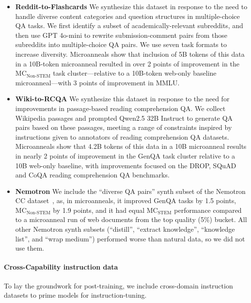 \documentclass[table]{ai2style/ai2}
\begin{document}
\begin{itemize}
\item {\bf Reddit-to-Flashcards} We synthesize this dataset in response to the need to handle diverse content categories and question structures in multiple-choice QA tasks. We first identify a subset of academically-relevant subreddits, and then use GPT 4o-mini to rewrite submission-comment pairs from those subreddits into multiple-choice QA pairs.
We use seven task formats to increase diversity.
Microanneals show that inclusion of 5B tokens of this data in a 10B-token microanneal resulted in over 2 points of improvement in the $\text{MC}_\text{Non-STEM}$ task cluster---relative to a 10B-token web-only baseline microanneal---with 3 points of improvement in MMLU.

\item {\bf Wiki-to-RCQA} We synthesize this dataset in response to the need for improvements in passage-based reading comprehension QA. We collect Wikipedia passages and prompted Qwen2.5 32B Instruct to generate QA pairs based on these passages, meeting a range of constraints inspired by instructions given to annotators of reading comprehension QA datasets. Microanneals show that 4.2B tokens of this data in a 10B microanneal results in nearly 2 points of improvement in the GenQA task cluster relative to a 10B web-only baseline, with improvements focused on the DROP, SQuAD and CoQA reading comprehension QA benchmarks.

\item {\bf Nemotron} We include the ``diverse QA pairs'' synth subset of the Nemotron CC dataset~\citep{su2025nemotroncctransformingcommoncrawl},
as, in microanneals, it improved GenQA tasks by 1.5 points, $\text{MC}_\text{Non-STEM}$ by 1.9 points, and it had equal $\text{MC}_\text{STEM}$ performance compared to a microanneal run of web documents from the top quality (5\%) bucket.
All other Nemotron synth subsets (``distill'', ``extract knowledge'', ``knowledge list'', and ``wrap medium'') performed worse than natural data, so we did not use them.

\end{itemize}

\paragraph{Cross-Capability instruction data}
To lay the groundwork for post-training, we include cross-domain instruction datasets to prime models for instruction-tuning.
\end{document}
